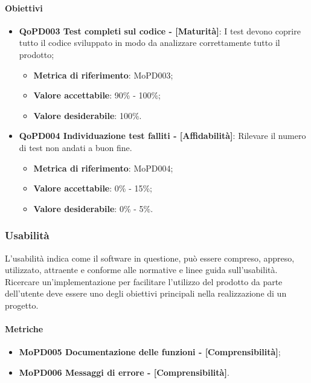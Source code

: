 \documentclass[../piano-di-qualifica.tex]{subfiles}
\begin{document}
\paragraph{Obiettivi}
\label{sub:obiettivi}
\begin{itemize}
    \item \textbf{QoPD003 Test completi sul codice - [Maturità]}: I test devono coprire tutto il codice sviluppato in modo da analizzare correttamente tutto il prodotto;
        \begin{itemize}
            \item \textbf{Metrica di riferimento}: MoPD003;
            \item \textbf{Valore accettabile}: 90\% - 100\%;
            \item \textbf{Valore desiderabile}: 100\%.
        \end{itemize}
    \item \textbf{QoPD004 Individuazione test falliti - [Affidabilità]}: Rilevare il numero di test non andati a buon fine.
        \begin{itemize}
            \item \textbf{Metrica di riferimento}: MoPD004;
            \item \textbf{Valore accettabile}: 0\% - 15\%;
            \item \textbf{Valore desiderabile}: 0\% - 5\%.
        \end{itemize}
\end{itemize}

\subsubsection{Usabilità}%
\label{sub:usabilita}
L'usabilità indica come il software in questione, può essere compreso, appreso, utilizzato, attraente e conforme alle normative e linee guida sull'usabilità.
Ricercare un'implementazione per facilitare l'utilizzo del prodotto da parte dell'utente deve essere uno degli obiettivi principali nella realizzazione di un progetto.

\paragraph{Metriche}
\label{sub:metriche}
\begin{itemize}
    \item \textbf{MoPD005 Documentazione delle funzioni - [Comprensibilità]};
    \item \textbf{MoPD006 Messaggi di errore - [Comprensibilità]}.
\end{itemize}
\end{document}
